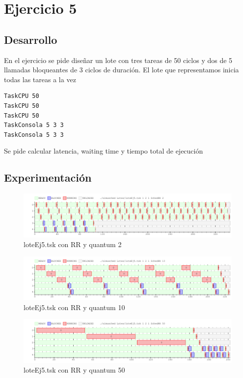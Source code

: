 \section{Ejercicio 5}


\subsection{Desarrollo}
En el ejercicio se pide diseñar un lote con tres tareas de 50 ciclos y dos de 5 llamadas bloqueantes de 3 ciclos de duración. El lote que representamos inicia todas las tareas a la vez
\begin{verbatim}
TaskCPU 50
TaskCPU 50
TaskCPU 50
TaskConsola 5 3 3
TaskConsola 5 3 3
\end{verbatim}
Se pide calcular latencia, waiting time y tiempo total de ejecución 
\subsection{Experimentación}
\begin{figure}[H]
  \centering
    \includegraphics[width=1.1\textwidth]{imagenes/Ej5_q2.png}
  \caption{loteEj5.tsk con RR y quantum 2}
\end{figure}
\begin{figure}[H]
  \centering
    \includegraphics[width=1.1\textwidth]{imagenes/Ej5_q10.png}
  \caption{loteEj5.tsk con RR y quantum 10}
\end{figure}
\begin{figure}[H]
  \centering
    \includegraphics[width=1.1\textwidth]{imagenes/Ej5_q50.png}
  \caption{loteEj5.tsk con RR y quantum 50}
\end{figure}
